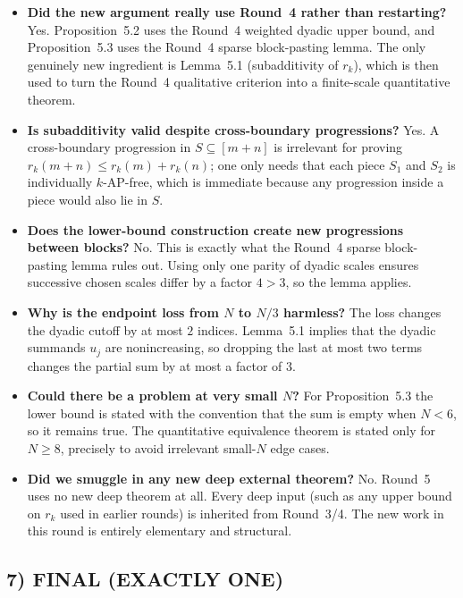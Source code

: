 \begin{itemize}
\item \textbf{Did the new argument really use Round~4 rather than restarting?}
Yes. Proposition~5.2 uses the Round~4 weighted dyadic upper bound, and Proposition~5.3 uses the Round~4 sparse block-pasting lemma. The only genuinely new ingredient is Lemma~5.1 (subadditivity of $r_k$), which is then used to turn the Round~4 qualitative criterion into a finite-scale quantitative theorem.

\item \textbf{Is subadditivity valid despite cross-boundary progressions?}
Yes. A cross-boundary progression in $S\subseteq [m+n]$ is irrelevant for proving $r_k(m+n)\le r_k(m)+r_k(n)$; one only needs that each piece $S_1$ and $S_2$ is individually $k$-AP-free, which is immediate because any progression inside a piece would also lie in $S$.

\item \textbf{Does the lower-bound construction create new progressions between blocks?}
No. This is exactly what the Round~4 sparse block-pasting lemma rules out. Using only one parity of dyadic scales ensures successive chosen scales differ by a factor $4>3$, so the lemma applies.

\item \textbf{Why is the endpoint loss from $N$ to $N/3$ harmless?}
The loss changes the dyadic cutoff by at most $2$ indices. Lemma~5.1 implies that the dyadic summands $u_j$ are nonincreasing, so dropping the last at most two terms changes the partial sum by at most a factor of $3$.

\item \textbf{Could there be a problem at very small $N$?}
For Proposition~5.3 the lower bound is stated with the convention that the sum is empty when $N<6$, so it remains true. The quantitative equivalence theorem is stated only for $N\ge 8$, precisely to avoid irrelevant small-$N$ edge cases.

\item \textbf{Did we smuggle in any new deep external theorem?}
No. Round~5 uses no new deep theorem at all. Every deep input (such as any upper bound on $r_k$ used in earlier rounds) is inherited from Round~3/4. The new work in this round is entirely elementary and structural.
\end{itemize}

\subsection{7) FINAL (EXACTLY ONE)}

